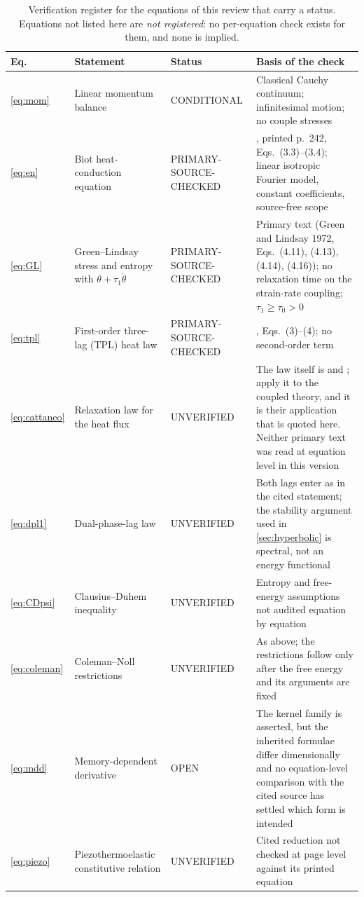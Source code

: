 \begin{table}[H]\centering\small
\caption{Verification register for the equations of this review that carry a status. Equations not listed
here are \emph{not registered}: no per-equation check exists for them, and none is implied.}
\label{tab:eqregister}
\begin{tabularx}{\textwidth}{@{}lY p{2.45cm}Y@{}}
\toprule
\textbf{Eq.} & \textbf{Statement} & \textbf{Status} & \textbf{Basis of the check} \\
\midrule
\eqref{eq:mom} & Linear momentum balance & CONDITIONAL & Classical Cauchy continuum; infinitesimal
  motion; no couple stresses \\
\eqref{eq:en} & Biot heat-conduction equation & PRIMARY-SOURCE-CHECKED & \citet{Biot1956}, printed p.~242,
  Eqs.~(3.3)--(3.4); linear isotropic Fourier model, constant coefficients, source-free scope \\
\eqref{eq:GL} & Green--Lindsay stress and entropy with $\theta+\tau_1\dot\theta$ & PRIMARY-SOURCE-CHECKED &
  Primary text (Green and Lindsay 1972, Eqs.~(4.11), (4.13), (4.14), (4.16)); no relaxation time on the strain-rate coupling;
  $\tau_1\ge\tau_0>0$ \\
\eqref{eq:tpl} & First-order three-lag (TPL) heat law & PRIMARY-SOURCE-CHECKED & \citet{RoyChoudhuri2007},
  Eqs.~(3)--(4); no second-order term \\
\eqref{eq:cattaneo} & Relaxation law for the heat flux & UNVERIFIED & The law itself is \citet{Cattaneo1948} and
  \citet{Vernotte1958}; \citet{Lord1967} apply it to the coupled theory, and it is their application that is
  quoted here. Neither primary text was read at equation level in this version \\
\eqref{eq:dpl1} & Dual-phase-lag law & UNVERIFIED & Both lags enter as in the cited statement; the
  stability argument used in \cref{sec:hyperbolic} is spectral, not an energy functional \\
\eqref{eq:CDpsi} & Clausius--Duhem inequality & UNVERIFIED & Entropy and free-energy assumptions not
  audited equation by equation \\
\eqref{eq:coleman} & Coleman--Noll restrictions & UNVERIFIED & As above; the restrictions follow only after
  the free energy and its arguments are fixed \\
\eqref{eq:mdd} & Memory-dependent derivative & OPEN & The kernel family is asserted, but the inherited formulae differ
  dimensionally and no equation-level comparison with the cited source has settled which form is intended \\
\eqref{eq:piezo} & Piezothermoelastic constitutive relation & UNVERIFIED & Cited reduction not checked at
  page level against its printed equation \\
\bottomrule
\end{tabularx}
\end{table}


